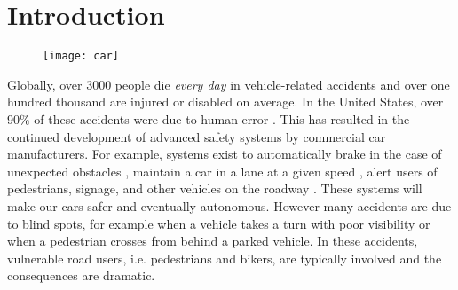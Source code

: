 
\section{Introduction}

\begin{figure}
    \centering

    \texttt{[image: car]}

\end{figure}

Globally, over 3000 people die \emph{every day} \cite{ASIR2016} in vehicle-related accidents and over one hundred thousand are injured or disabled on average.
In the United States, over 90\% of these accidents were due to human error \cite{NHTSA_crash_stats}.
This has resulted in the continued development of advanced safety systems by commercial car manufacturers.
For example, systems exist to automatically brake in the case of unexpected obstacles \cite{Toyota_patent}, maintain a car in a lane at a given speed \cite{bradley2016tesla}, alert users of pedestrians, signage, and other vehicles on the roadway \cite{Dagan_IVS_2004}. These systems will make our cars safer and eventually autonomous.
However many accidents are due to blind spots, for example when a vehicle takes a turn with poor visibility or when a pedestrian crosses from behind a parked vehicle. In these accidents, vulnerable road users, i.e. pedestrians and bikers, are typically involved and the consequences are dramatic.

